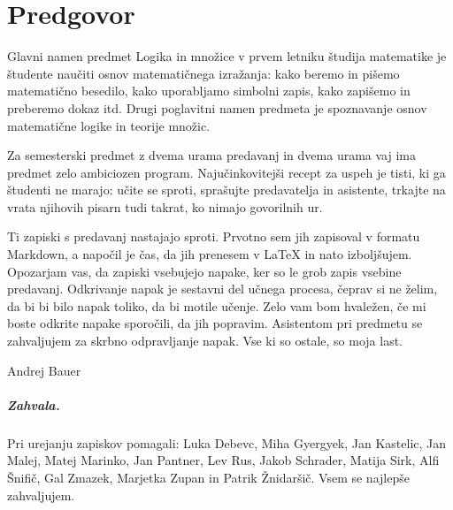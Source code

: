 \chapter{Predgovor}
\label{chap:predgovor}

Glavni namen predmet Logika in množice v prvem letniku študija matematike je študente
naučiti osnov matematičnega izražanja: kako beremo in pišemo matematično besedilo, kako
uporabljamo simbolni zapis, kako zapišemo in preberemo dokaz itd. Drugi poglavitni namen
predmeta je spoznavanje osnov matematične logike in teorije množic.

Za semesterski predmet z dvema urama predavanj in dvema urama vaj ima predmet zelo
ambiciozen program. Najučinkovitejši recept za uspeh je tisti, ki ga študenti ne marajo:
učite se sproti, sprašujte predavatelja in asistente, trkajte na vrata njihovih pisarn
tudi takrat, ko nimajo govorilnih ur.

Ti zapiski s predavanj nastajajo sproti. Prvotno sem jih zapisoval v formatu Markdown, a napočil je čas, da jih prenesem v {\LaTeX} in nato izboljšujem. Opozarjam vas, da zapiski vsebujejo napake, ker so le grob zapis vsebine predavanj. Odkrivanje napak je sestavni del učnega procesa, čeprav si ne želim, da bi bi bilo napak toliko, da bi motile učenje. Zelo vam bom hvaležen, če mi boste odkrite napake sporočili, da jih popravim. Asistentom pri predmetu se zahvaljujem za skrbno odpravljanje napak. Vse ki so ostale, so moja last.

\bigskip

\begin{flushright}
Andrej Bauer \qquad\hbox{}
\end{flushright}

\bigskip

\paragraph{Zahvala.}
%
Pri urejanju zapiskov pomagali:
%
Luka Debevc,
Miha Gyergyek,
Jan Kastelic,
Jan Malej,
Matej Marinko,
Jan Pantner,
Lev Rus,
Jakob Schrader,
Matija Sirk,
Alfi Šnifič,
Gal Zmazek,
Marjetka Zupan in Patrik Žnidaršič.
%
Vsem se najlepše zahvaljujem.


